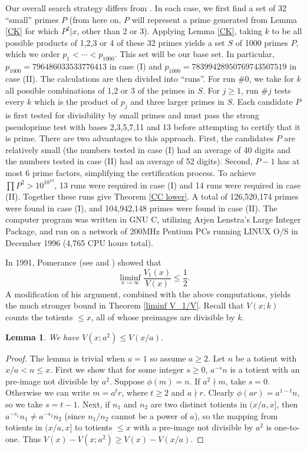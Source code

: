 \documentclass[11pt]{amsart}
\theoremstyle{remark}
\theoremstyle{plain}
\newtheorem{lem}{Lemma}[section]
\numberwithin{equation}{section}
\newcommand{\be}{\begin{equation}}
\newcommand{\ee}{\end{equation}}
\renewcommand{\(}{\left(}
\renewcommand{\)}{\right)}
\renewcommand{\le}{\leqslant}
\renewcommand{\ge}{\geqslant}
\begin{document}
Our overall search strategy differs from \cite{SW}.  In each case, we first
find a set of 32 ``small'' primes $P$ (from here on, $P$ will represent a
prime generated from Lemma \ref{CK} for which $P^2|x$, other than 2 or 3).
Applying Lemma \ref{CK}, taking $k$ to be all possible products of
1,2,3 or 4 of these 32 primes yields a set $S$ of 1000 primes $P$, 
which we order $p_1< \cdots < p_{1000}$.  This set will be our base set.
In particular, $p_{1000}=796486033533776413$ in case (I)
 and $p_{1000}=78399428950769743507519$ in case
(II).  The calculations are then divided into ``runs''.  For run \#0, we take
for $k$ all possible combinations of 1,2 or 3 of the primes in $S$.
For $j\ge 1$, run \#$j$ tests every $k$ which is the product of $p_j$ and
three larger primes in $S$.   Each candidate $P$ is
first tested for divisibility by small primes and must pass the strong
pseudoprime test with bases 2,3,5,7,11 and 13 before attempting to
certify that it is prime.
There are two advantages to this approach.  First, the candidates $P$
are relatively small (the numbers tested in case (I) had an average of
40 digits and the numbers tested in case (II) had an average of 52 digits).
Second, $P-1$ has at most 6 prime factors, simplifying the certification
process. 
To achieve $\prod P^2 > 10^{10^{10}}$,
13 runs  were required in case (I) and 14 runs were
required in case (II).  Together these runs give Theorem \ref{CC lower}.
A total of 126,520,174 primes were found in case (I), and 
104,942,148 primes were found in case (II).
The computer program was written in GNU C, utilizing Arjen Lenstra's
Large Integer Package, and run on a network of 200MHz
Pentium PCs running LINUX O/S in December 1996 (4,765 CPU hours total). 

In 1991, Pomerance (see \cite{P2} and \cite{M}) showed that
\be\label{liminf1/2}
\liminf_{x\to\infty} \frac{V_1(x)}{V(x)} \le \frac12.
\ee
A modification of his argument, combined
with the above computations, yields the much stronger
bound in Theorem \ref{liminf V_1/V}.
Recall that $V(x;k)$ counts the totients $\le x$, all of whose preimages 
are divisible by $k$.

\begin{lem} \label{V a^2}
We have $V(x;a^2) \le V(x/a).$
\end{lem}
\begin{proof}  The lemma is trivial when $a=1$ so assume $a\ge 2$.
Let $n$ be a totient with $x/a<n\le x$.  First we show that
for some integer $s\ge 0$, $a^{-s}n$ is a
 totient with an pre-image not divisible by $a^2$.
Suppose $\phi(m)=n$.  If $a^2\nmid m$, take $s=0$.  Otherwise
we can write $m=a^tr$, where $t\ge 2$ and $a\nmid r$.  Clearly
$\phi(ar)=a^{1-t}n$, so we take $s=t-1$.
Next, if $n_1$ and $n_2$ are two distinct totients in $(x/a,x]$,
then $a^{-s_1}n_1 \ne a^{-s_2}n_2$ (since $n_1/n_2$ cannot be
 a power of $a$), so the mapping from totients in $(x/a,x]$
to totients $\le x$ with a pre-image not divisible by $a^2$ is one-to-one.
Thus
$V(x) - V(x;a^2) \ge V(x) - V(x/a).$
 \end{proof}
\end{document}
